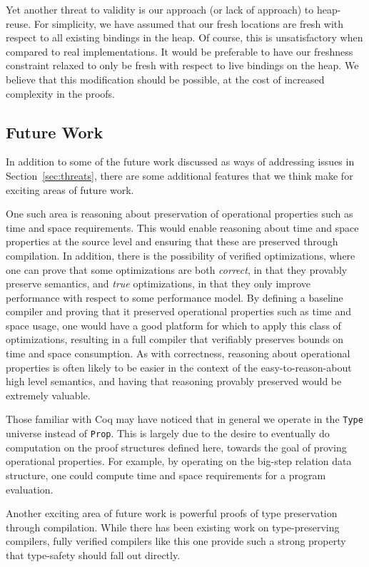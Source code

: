 Yet another threat to validity is our approach (or lack of approach) to
heap-reuse. For simplicity, we have assumed that our fresh locations are fresh
with respect to all existing bindings in the heap. Of course, this is
unsatisfactory when compared to real implementations. It would be preferable to
have our freshness constraint relaxed to only be fresh with respect to live
bindings on the heap. We believe that this modification should be possible, at
the cost of increased complexity in the proofs. 

\subsection{Future Work}

In addition to some of the future work discussed as ways of addressing issues 
in Section~\ref{sec:threats}, there are some additional features that we think
make for exciting areas of future work. 

One such area is reasoning about preservation of operational properties such as
time and space requirements. This would enable reasoning about time and space
properties at the source level and ensuring that these are preserved through
compilation. In addition, there is the possibility of verified optimizations,
where one can prove that some optimizations are both \emph{correct}, in that
they provably preserve semantics, and \emph{true} optimizations, in that they
only improve performance with respect to some performance model. By defining a
baseline compiler and proving that it preserved operational properties such as
time and space usage, one would have a good platform for which to apply this
class of optimizations, resulting in a full compiler that verifiably preserves 
bounds on time and space consumption. As with correctness, reasoning about
operational properties is often likely to be easier in the context of the
easy-to-reason-about high level semantics, and having that reasoning provably
preserved would be extremely valuable. 

Those familiar with Coq may have noticed that in general we operate in the
\texttt{Type} universe instead of \texttt{Prop}. This is largely due to the
desire to eventually do computation on the proof structures defined here,
towards the goal of proving operational properties. For example, by operating on 
the big-step relation data structure, one could compute time and space
requirements for a program evaluation.

Another exciting area of future work is powerful proofs of type preservation
through compilation.  While there has been existing work on type-preserving
compilers, fully verified compilers like this one provide such a strong property
that type-safety should fall out directly.

